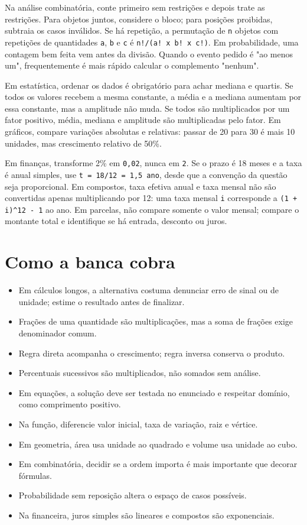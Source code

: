 \documentclass[11pt,a4paper]{article}
\begin{document}
Na análise combinatória, conte primeiro sem restrições e depois trate as restrições. Para objetos juntos, considere o bloco; para posições proibidas, subtraia os casos inválidos. Se há repetição, a permutação de \texttt{n} objetos com repetições de quantidades \texttt{a}, \texttt{b} e \texttt{c} é \texttt{n!/(a! x b! x c!)}. Em probabilidade, uma contagem bem feita vem antes da divisão. Quando o evento pedido é "ao menos um", frequentemente é mais rápido calcular o complemento "nenhum".

Em estatística, ordenar os dados é obrigatório para achar mediana e quartis. Se todos os valores recebem a mesma constante, a média e a mediana aumentam por essa constante, mas a amplitude não muda. Se todos são multiplicados por um fator positivo, média, mediana e amplitude são multiplicadas pelo fator. Em gráficos, compare variações absolutas e relativas: passar de 20 para 30 é mais 10 unidades, mas crescimento relativo de 50\%.

Em finanças, transforme 2\% em \texttt{0,02}, nunca em \texttt{2}. Se o prazo é 18 meses e a taxa é anual simples, use \texttt{t = 18/12 = 1,5 ano}, desde que a convenção da questão seja proporcional. Em compostos, taxa efetiva anual e taxa mensal não são convertidas apenas multiplicando por 12: uma taxa mensal \texttt{i} corresponde a \texttt{(1 + i)\textasciicircum{}12 - 1} ao ano. Em parcelas, não compare somente o valor mensal; compare o montante total e identifique se há entrada, desconto ou juros.

\section*{Como a banca cobra}

\begin{itemize}
  \item Em cálculos longos, a alternativa costuma denunciar erro de sinal ou de unidade; estime o resultado antes de finalizar.
  \item Frações de uma quantidade são multiplicações, mas a soma de frações exige denominador comum.
  \item Regra direta acompanha o crescimento; regra inversa conserva o produto.
  \item Percentuais sucessivos são multiplicados, não somados sem análise.
  \item Em equações, a solução deve ser testada no enunciado e respeitar domínio, como comprimento positivo.
  \item Na função, diferencie valor inicial, taxa de variação, raiz e vértice.
  \item Em geometria, área usa unidade ao quadrado e volume usa unidade ao cubo.
  \item Em combinatória, decidir se a ordem importa é mais importante que decorar fórmulas.
  \item Probabilidade sem reposição altera o espaço de casos possíveis.
  \item Na financeira, juros simples são lineares e compostos são exponenciais.
\end{itemize}
\end{document}
